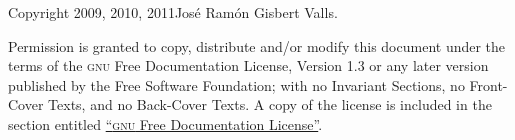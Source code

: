 
Copyright \textcopyright{}  2009, 2010, 2011\quad José Ramón Gisbert
Valls.\vspace{2\bigskipamount}


Permission is granted to copy, distribute and/or modify this document under
the terms of the \textsc{gnu} Free Documentation License, Version 1.3 or
any later version published by the Free Software Foundation; with no
Invariant Sections, no Front-Cover Texts, and no Back-Cover Texts.  A copy
of the license is included in the section entitled
\hyperref[chap:license]{``\textsc{gnu} Free Documentation License''}.

